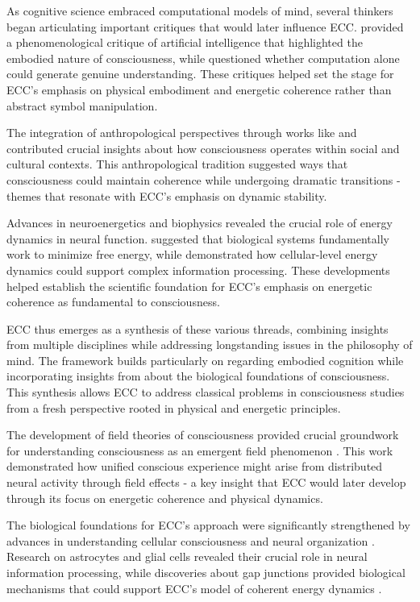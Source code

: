 \begin{refsection}
As cognitive science embraced computational models of mind, several thinkers began articulating important critiques that would later influence ECC. \cite{dreyfus1972computers} provided a phenomenological critique of artificial intelligence that highlighted the embodied nature of consciousness, while \cite{searle1980minds} questioned whether computation alone could generate genuine understanding. These critiques helped set the stage for ECC's emphasis on physical embodiment and energetic coherence rather than abstract symbol manipulation.

The integration of anthropological perspectives through works like \cite{rappaport1979ecology} and \cite{turner1967forest} contributed crucial insights about how consciousness operates within social and cultural contexts. This anthropological tradition suggested ways that consciousness could maintain coherence while undergoing dramatic transitions - themes that resonate with ECC's emphasis on dynamic stability.

Advances in neuroenergetics and biophysics revealed the crucial role of energy dynamics in neural function. \cite{friston2010free} suggested that biological systems fundamentally work to minimize free energy, while \cite{levin2019computational} demonstrated how cellular-level energy dynamics could support complex information processing. These developments helped establish the scientific foundation for ECC's emphasis on energetic coherence as fundamental to consciousness.

ECC thus emerges as a synthesis of these various threads, combining insights from multiple disciplines while addressing longstanding issues in the philosophy of mind. The framework builds particularly on \cite{varela1991embodied} regarding embodied cognition while incorporating insights from \cite{churchland1986neurophilosophy} about the biological foundations of consciousness. This synthesis allows ECC to address classical problems in consciousness studies from a fresh perspective rooted in physical and energetic principles.

The development of field theories of consciousness provided crucial groundwork for understanding consciousness as an emergent field phenomenon \cite{hayles1999posthuman}. This work demonstrated how unified conscious experience might arise from distributed neural activity through field effects - a key insight that ECC would later develop through its focus on energetic coherence and physical dynamics.

The biological foundations for ECC's approach were significantly strengthened by advances in understanding cellular consciousness and neural organization \cite{margulis2001conscious}. Research on astrocytes and glial cells revealed their crucial role in neural information processing, while discoveries about gap junctions provided biological mechanisms that could support ECC's model of coherent energy dynamics \cite{friston2010free}.


\end{refsection}

